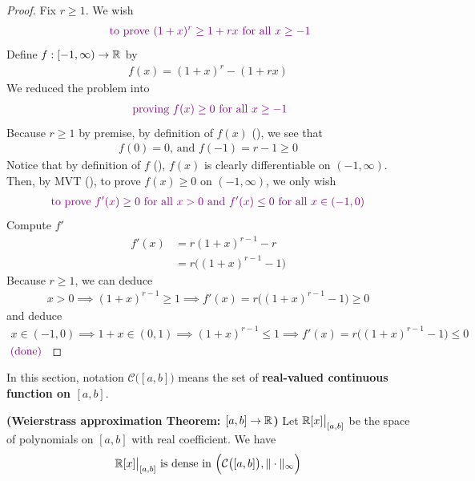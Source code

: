 \documentclass{report}
\begin{document}
\begin{proof}
Fix $r\geq 1$. We wish 
\begin{align*}
\textcolor{violet}{\text{ to prove }(1+x)^r\geq 1+rx\text{ for all  }x \geq -1}
\end{align*}
Define $f:[-1,\infty)\rightarrow \mathbb{R}$ by 
 \begin{align}
\label{Bere1}
f(x)=(1+x)^r-(1+rx)
\end{align}
We reduced the problem into  
\begin{align*}
\textcolor{violet}{\text{ proving }f(x)\geq 0\text{ for all } x\geq -1}
\end{align*}
Because $r\geq 1$ by premise, by definition of $f(x)$  (), we see that 
\begin{align*}
f(0)=0\text{, and }f(-1)=r-1\geq 0
\end{align*}
Notice that by definition of $f$  (),  $f(x)$ is clearly differentiable on $(-1,\infty)$.\\

Then, by MVT (), to prove $f(x)\geq 0$ on $(-1,\infty)$, we only wish 
\begin{align*}
\textcolor{violet}{\text{ to prove }f'(x)\geq 0\text{ for all }x> 0\text{ and }f'(x)\leq 0\text{ for all $x \in (-1,0)$ }}
\end{align*}
Compute $f'$
 \begin{align*}
f'(x)&=r(1+x)^{r-1}-r\\
&=r\Big((1+x)^{r-1}-1 \Big)
\end{align*}
Because $r\geq 1$, we can deduce 
\begin{align*}
x>0 \implies (1+x)^{r-1}\geq 1 \implies f'(x)=r\Big((1+x)^{r-1}-1 \Big)\geq 0
\end{align*}
and deduce 
\begin{align*}
x \in (-1,0) \implies 1+x \in (0,1) \implies (1+x)^{r-1}\leq 1 \implies f'(x)=r\Big((1+x)^{r-1}-1 \Big)\leq  0
\end{align*}
$\textcolor{violet}{\text{ (done) }}$
\end{proof}
\begin{mdframed}
In this section, notation  $\mathcal{C}\big([a,b] \big)$ means the set of \textbf{real-valued continuous function on $[a,b]$}.
\end{mdframed}
\begin{theorem}
\textbf{(Weierstrass approximation Theorem: $[a,b]\rightarrow \mathbb{R}$)} Let $\mathbb{R}[x]\big|_{[a,b]}$ be the space of polynomials on $[a,b]$ with real coefficient. We have 
\begin{align*}
\text{ $\mathbb{R}[x]\big|_{[a,b]}$ is dense in $\Big(\mathcal{C}\big([a,b] \big),\| \cdot \|_{\infty} \Big)$ }
\end{align*}
\end{theorem}
\end{document}
